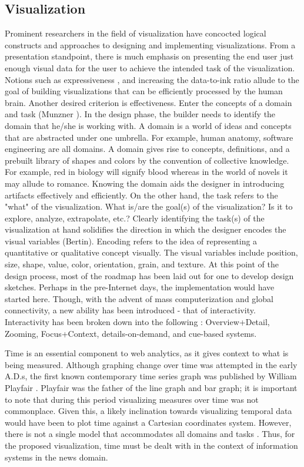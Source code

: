 \documentclass[12pt]{article}
\begin{document}
\subsection{Visualization}
Prominent researchers in the field of visualization have concocted logical constructs and approaches to designing and implementing visualizations. From a presentation standpoint, there is much emphasis on presenting the end user just enough visual data for the user to achieve the intended task of the visualization. Notions such as expressiveness \cite{schumann}, and increasing the data-to-ink ratio \cite{tufte} allude to the goal of building visualizations that can be efficiently processed by the human brain. Another desired criterion is effectiveness. Enter the concepts of a domain and task (Munzner \cite{munzner}). In the design phase, the builder needs to identify the domain that he/she is working with. A domain is a world of ideas and concepts that are abstracted under one umbrella. For example, human anatomy, software engineering are all domains. A domain gives rise to concepts, definitions, and a prebuilt library of shapes and colors by the convention of collective knowledge. For example, red in biology will signify blood whereas in the world of novels it may allude to romance. Knowing the domain aids the designer in introducing artifacts effectively and efficiently. On the other hand, the task refers to the "what" of the visualization. What is/are the goal(s) of the visualization? Is it to explore, analyze, extrapolate, etc.? Clearly identifying the task(s) of the visualization at hand solidifies the direction in which the designer encodes the visual variables (Bertin). Encoding refers to the idea of representing a quantitative or qualitative concept visually. The visual variables include position, size, shape, value, color, orientation, grain, and texture. At this point of the design process, most of the roadmap has been laid out for one to develop design sketches. Perhaps in the pre-Internet days, the implementation would have started here. Though, with the advent of mass computerization and global connectivity, a new ability has been introduced - that of interactivity. Interactivity has been broken down into the following \cite{cockburn}: Overview+Detail, Zooming, Focus+Context, details-on-demand, and cue-based systems.

Time is an essential component to web analytics, as it gives context to what is being measured. Although graphing change over time was attempted in the early A.D.s, the first known contemporary time series graph was published by William Playfair \cite{playfair}. Playfair was the father of the line graph and bar graph; it is important to note that during this period visualizing measures over time was not commonplace. Given this, a likely inclination towards visualizing temporal data would have been to plot time against a Cartesian coordinates system. However, there is not a single model that accommodates all domains and tasks \cite{frank}. Thus, for the proposed visualization, time must be dealt with in the context of information systems in the news domain. 
\end{document}

